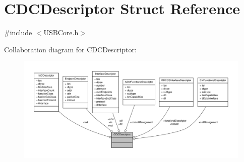 \hypertarget{struct_c_d_c_descriptor}{\section{C\-D\-C\-Descriptor Struct Reference}
\label{struct_c_d_c_descriptor}
}


{\ttfamily \#include $<$U\-S\-B\-Core.\-h$>$}



Collaboration diagram for C\-D\-C\-Descriptor\-:
\nopagebreak
\begin{figure}[H]
\begin{center}
\leavevmode
\includegraphics[width=350pt]{struct_c_d_c_descriptor__coll__graph}
\end{center}
\end{figure}
